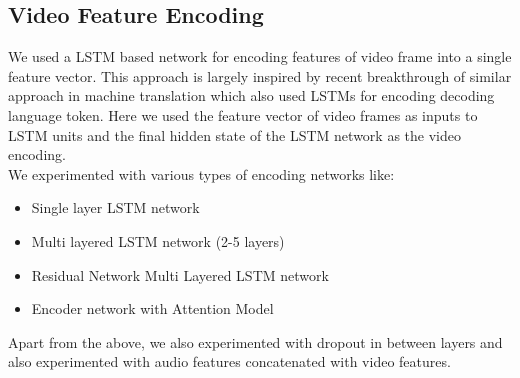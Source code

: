 \documentclass[12pt]{article}
\begin{document}
\subsection{Video Feature Encoding}
	We used a LSTM based network for encoding features of video frame into a single feature vector. This approach is largely inspired by recent
	breakthrough of similar approach in machine translation which also used LSTMs for encoding decoding language token. Here we used the feature
	vector of video frames as inputs to LSTM units and the final hidden state of the LSTM network as the video encoding.\\ 
	We experimented with various types of encoding networks like:
	\begin{itemize}
		\item Single layer LSTM network
		\item Multi layered LSTM network (2-5 layers)
		\item Residual Network Multi Layered LSTM network
		\item Encoder network with Attention Model
	\end{itemize}
	Apart from the above, we also experimented with dropout in between layers and also experimented with audio features concatenated with
	video features.
\end{document}

